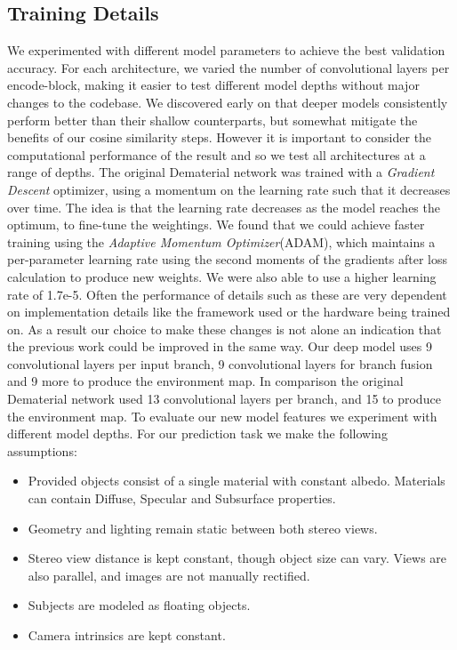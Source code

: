 \documentclass[ %
                    author={Gavin Parker},
                supervisor={Dr. Neill Campbell},
                    degree={MEng},
                     title={Deep Siamese Networks for Illumination Estimation from Stereo Images},
                  subtitle={},
                      type={Research},
                      year={2018} ]{dissertation}
\begin{document}
\subsection{Training Details}
 We experimented with different model parameters to achieve the best validation accuracy. For each architecture, we varied the number of convolutional layers per encode-block, making it easier to test different model depths without major changes to the codebase. We discovered early on that deeper models consistently perform better than their shallow counterparts, but somewhat mitigate the benefits of our cosine similarity steps. However it is important to consider the computational performance of the result and so we test all architectures at a range of depths.
\newline
The original Dematerial network was trained with a \textit{Gradient Descent} optimizer, using a momentum on the learning rate such that it decreases over time. The idea is that the learning rate decreases as the model reaches the optimum, to fine-tune the weightings. We found that we could achieve faster training using the \textit{Adaptive Momentum Optimizer}(ADAM), which maintains a per-parameter learning rate using the second moments of the gradients after loss calculation to produce new weights. We were also able to use a higher learning rate of 1.7e-5. Often the performance of details such as these are very dependent on implementation details like the framework used or the hardware being trained on. As a result our choice to make these changes is not alone an indication that the previous work could be improved in the same way.
\newline
Our deep model uses 9 convolutional layers per input branch, 9 convolutional layers for branch fusion and 9 more to produce the environment map. In comparison the original Dematerial network used 13 convolutional layers per branch, and 15 to produce the environment map. To evaluate our new model features we experiment with different model depths.
\newline
For our prediction task we make the following assumptions:
\begin{itemize}
\item Provided objects consist of a single material with constant albedo. Materials can contain Diffuse, Specular and Subsurface properties.
\item Geometry and lighting remain static between both stereo views.
\item Stereo view distance is kept constant, though object size can vary. Views are also parallel, and images are not manually rectified.
\item Subjects are modeled as floating objects.
\item Camera intrinsics are kept constant.
\end{itemize}
\end{document}
